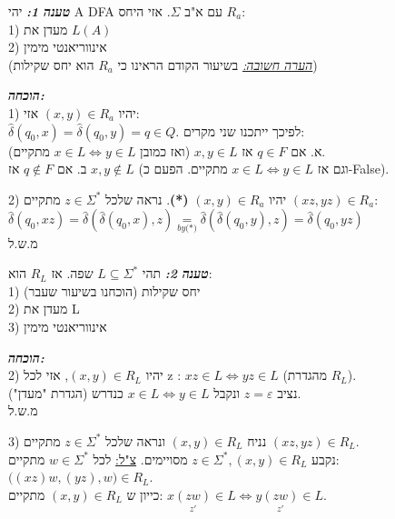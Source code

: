 \documentclass{article}
\begin{document}
\setlength\parskip{\baselineskip}

\textbf{\emph{טענה 1:}} יהי A DFA עם א"ב $\Sigma$.
אזי היחס $R_{a}$:\\
1) מעדן את $L(A)$\\
2) אינווריאנטי מימין\\
(\emph{\underline{הערה חשובה:}} בשיעור הקודם הראינו כי $R_{a}$ הוא יחס שקילות)

\setlength\parskip{\baselineskip}

\textbf{\emph{הוכחה:}}\\
1) יהיו $(x,y) \in R_{a}$ אזי:\\
$\hat{\delta}(q_{0},x) = \hat{\delta}(q_{0},y) = q \in Q$. לפיכך ייתכנו שני מקרים:\\
א. אם $q \in F$ אז $x,y \in L$ (ואז כמובן $x \in L \Leftrightarrow y \in L$ מתקיים).\\
ב. אם $q \notin F$ אז $x,y \notin L$ (וגם אז $x \in L \Leftrightarrow y \in L$ מתקיים. הפעם כ-False).

\setlength\parskip{\baselineskip}

2) יהיו $(x,y) \in {R_{a}}$ \textbf{(*)}. נראה שלכל $z \in \Sigma^*$ מתקיים $(xz,yz) \in R_{a}$:\\
$\hat{\delta}(q_{0},xz) = \hat{\delta}(\hat{\delta}(q_{0},x),z) \underset{by \textbf{(*)}}{=} \hat{\delta}(\hat{\delta}(q_{0},y),z) = \hat{\delta}(q_{0},yz)$\\
מ.ש.ל

\setlength\parskip{\baselineskip}

\textbf{\emph{טענה 2:}} תהי $L \subseteq \Sigma^*$ שפה. אז $R_{L}$ הוא:\\
1) יחס שקילות (הוכחנו בשיעור שעבר)\\
2) מעדן את L\\
3) אינווריאנטי מימין

\setlength\parskip{\baselineskip}

\textbf{\emph{הוכחה:}}\\
2) יהיו $(x,y) \in R_{L}$, אזי לכל z : $xz \in L \Leftrightarrow yz \in L$ (מהגדרת $R_{L}$).\\
נציב $z=\varepsilon$ ונקבל $x \in L \Leftrightarrow y \in L$ כנדרש (הגדרת "מעדן").\\
מ.ש.ל

\setlength\parskip{\baselineskip}

3) נניח $(x,y) \in R_{L}$ ונראה שלכל $z \in \Sigma^*$ מתקיים $(xz,yz) \in R_{L}$.\\
נקבע $z \in \Sigma^*, (x,y) \in R_{L}$ מסויימים. \underline{צ"ל:} לכל $w \in \Sigma^*$ מתקיים: $\big((xz)w,(yz),w\big) \in R_{L}$.\\
כייון ש $(x,y) \in R_{L}$ מתקיים: $x\underset{z'}{(zw)} \in L \Leftrightarrow y\underset{z'}{(zw)} \in L$.
\end{document}
